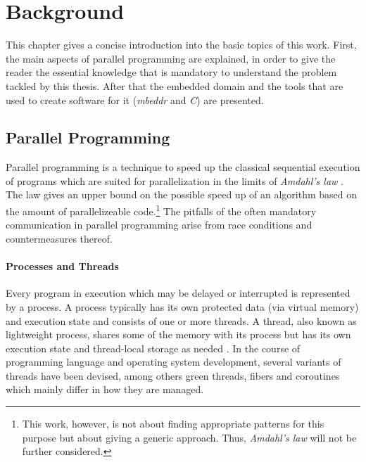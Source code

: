 \chapter{Background}
This chapter gives a concise introduction into the basic topics of this work. First, the main aspects of parallel programming are explained, in order to give the reader the essential knowledge that is mandatory to understand the problem tackled by this thesis. After that the embedded domain and the tools that are used to create software for it (\textit{mbeddr} and \textit{C}) are presented.

\section{Parallel Programming}
Parallel programming is a technique to speed up the classical sequential execution of programs which are suited for parallelization in the limits of \textit{Amdahl's law} \cite[p.~61]{IntroductionToParallelProgramming}. The law gives an upper bound on the possible speed up of an algorithm based on the amount of parallelizeable code.\footnote{This work, however, is not about finding appropriate patterns for this purpose but about giving a generic approach. Thus, \textit{Amdahl's law} will not be further considered.} The pitfalls of the often mandatory communication in parallel programming arise from race conditions and countermeasures thereof.

\subsubsection{Processes and Threads}
Every program in execution which may be delayed or interrupted is represented by a process. A process typically has its own protected data (via virtual memory) and execution state and consists of one or more threads. A thread, also known as lightweight process, shares some of the memory with its process but has its own execution state and thread-local storage as needed \cite[p.~20]{PrinciplesOfModernOSs}. In the course of programming language and operating system development, several variants of threads have been devised, among others green threads, fibers and coroutines which mainly differ in how they are managed.

